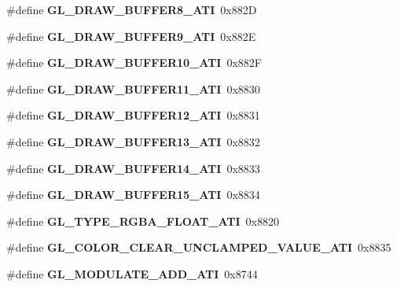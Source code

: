 \begin{DoxyCompactItemize}
\item 
\#define {\bfseries G\+L\+\_\+\+D\+R\+A\+W\+\_\+\+B\+U\+F\+F\+E\+R8\+\_\+\+A\+T\+I}~0x882\+D\label{_s_d_l__opengl_8h_af90310e18ccf2d6d3f6ca0d96f0cc860}

\item 
\#define {\bfseries G\+L\+\_\+\+D\+R\+A\+W\+\_\+\+B\+U\+F\+F\+E\+R9\+\_\+\+A\+T\+I}~0x882\+E\label{_s_d_l__opengl_8h_a243fe809c9e8090cdb88d7f1da74f535}

\item 
\#define {\bfseries G\+L\+\_\+\+D\+R\+A\+W\+\_\+\+B\+U\+F\+F\+E\+R10\+\_\+\+A\+T\+I}~0x882\+F\label{_s_d_l__opengl_8h_ae520c3303d2bf5210533f16189fd4b7e}

\item 
\#define {\bfseries G\+L\+\_\+\+D\+R\+A\+W\+\_\+\+B\+U\+F\+F\+E\+R11\+\_\+\+A\+T\+I}~0x8830\label{_s_d_l__opengl_8h_a792115cbd30775175925314343b4942e}

\item 
\#define {\bfseries G\+L\+\_\+\+D\+R\+A\+W\+\_\+\+B\+U\+F\+F\+E\+R12\+\_\+\+A\+T\+I}~0x8831\label{_s_d_l__opengl_8h_a2b63e757d04bc7e9df8402cf6e15320e}

\item 
\#define {\bfseries G\+L\+\_\+\+D\+R\+A\+W\+\_\+\+B\+U\+F\+F\+E\+R13\+\_\+\+A\+T\+I}~0x8832\label{_s_d_l__opengl_8h_a65a010a6348e6a1df716e573b5ce5bb5}

\item 
\#define {\bfseries G\+L\+\_\+\+D\+R\+A\+W\+\_\+\+B\+U\+F\+F\+E\+R14\+\_\+\+A\+T\+I}~0x8833\label{_s_d_l__opengl_8h_a3c35a4b156c49be36d961dfbdf01f978}

\item 
\#define {\bfseries G\+L\+\_\+\+D\+R\+A\+W\+\_\+\+B\+U\+F\+F\+E\+R15\+\_\+\+A\+T\+I}~0x8834\label{_s_d_l__opengl_8h_a265392fad514a30a0ecf8d0170d56b13}

\item 
\#define {\bfseries G\+L\+\_\+\+T\+Y\+P\+E\+\_\+\+R\+G\+B\+A\+\_\+\+F\+L\+O\+A\+T\+\_\+\+A\+T\+I}~0x8820\label{_s_d_l__opengl_8h_a0f048913730242239da65c79fe956a01}

\item 
\#define {\bfseries G\+L\+\_\+\+C\+O\+L\+O\+R\+\_\+\+C\+L\+E\+A\+R\+\_\+\+U\+N\+C\+L\+A\+M\+P\+E\+D\+\_\+\+V\+A\+L\+U\+E\+\_\+\+A\+T\+I}~0x8835\label{_s_d_l__opengl_8h_a11c28a6c42e070ca6ef680200652eab6}

\item 
\#define {\bfseries G\+L\+\_\+\+M\+O\+D\+U\+L\+A\+T\+E\+\_\+\+A\+D\+D\+\_\+\+A\+T\+I}~0x8744\label{_s_d_l__opengl_8h_aaac3fca68057ea3228d545ac9426e417}


\end{DoxyCompactItemize}
